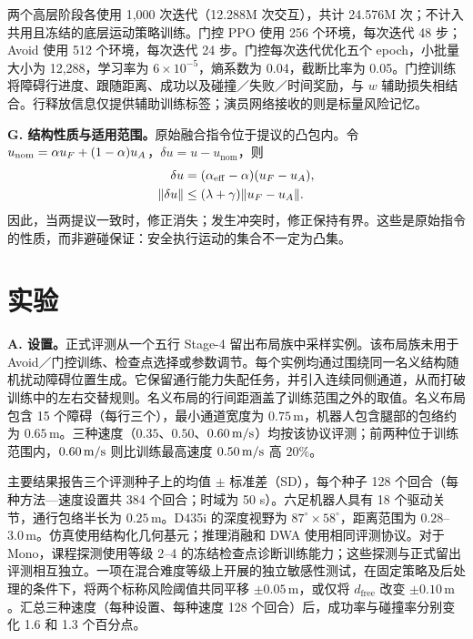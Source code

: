 两个高层阶段各使用 1,000 次迭代（12.288M 次交互），共计 24.576M 次；不计入共用且冻结的底层运动策略训练。门控 PPO 使用 256 个环境，每次迭代 48 步；Avoid 使用 512 个环境，每次迭代 24 步。门控每次迭代优化五个 epoch，小批量大小为 12,288，学习率为 $6\times10^{-5}$，熵系数为 0.04，截断比率为 0.05。门控训练将障碍行进度、跟随距离、成功以及碰撞／失败／时间奖励，与 $w$ 辅助损失相结合。行释放信息仅提供辅助训练标签；演员网络接收的则是标量风险记忆。

\textbf{G. 结构性质与适用范围。}原始融合指令位于提议的凸包内。令 $u_{\mathrm{nom}}=\alpha u_{F}+(1-\alpha)u_{A}$，$\delta u=u-u_{\mathrm{nom}}$，则
\begin{equation}
\begin{aligned}
\delta u &= (\alpha_{\mathrm{eff}}-\alpha)(u_{F}-u_{A}),\\
\|\delta u\| &\le (\lambda+\gamma)\|u_{F}-u_{A}\|.
\end{aligned}
\label{eq:residual_bound}
\end{equation}
因此，当两提议一致时，修正消失；发生冲突时，修正保持有界。这些是原始指令的性质，而非避碰保证：安全执行运动的集合不一定为凸集。

\section{实验}
\textbf{A. 设置。}正式评测从一个五行 Stage-4 留出布局族中采样实例。该布局族未用于 Avoid／门控训练、检查点选择或参数调节。每个实例均通过围绕同一名义结构随机扰动障碍位置生成。它保留通行能力失配任务，并引入连续同侧通道，从而打破训练中的左右交替规则。名义布局的行间距涵盖了训练范围之外的取值。名义布局包含 15 个障碍（每行三个），最小通道宽度为 $0.75\,\mathrm{m}$，机器人包含腿部的包络约为 $0.65\,\mathrm{m}$。三种速度（$0.35$、$0.50$、$0.60\,\mathrm{m/s}$）均按该协议评测；前两种位于训练范围内，$0.60\,\mathrm{m/s}$ 则比训练最高速度 $0.50\,\mathrm{m/s}$ 高 $20\%$。

主要结果报告三个评测种子上的均值 $\pm$ 标准差（SD），每个种子 128 个回合（每种方法—速度设置共 384 个回合；时域为 50 s）。六足机器人具有 18 个驱动关节，通行包络半长为 $0.25\,\mathrm{m}$。D435i 的深度视野为 $87^\circ\times58^\circ$，距离范围为 $0.28$--$3.0\,\mathrm{m}$。仿真使用结构化几何基元；推理消融和 DWA 使用相同评测协议。对于 Mono，课程探测使用等级 2--4 的冻结检查点诊断训练能力；这些探测与正式留出评测相互独立。一项在混合难度等级上开展的独立敏感性测试，在固定策略及后处理的条件下，将两个标称风险阈值共同平移 $\pm0.05\,\mathrm{m}$，或仅将 $d_{\mathrm{free}}$ 改变 $\pm0.10\,\mathrm{m}$。汇总三种速度（每种设置、每种速度 128 个回合）后，成功率与碰撞率分别变化 1.6 和 1.3 个百分点。


